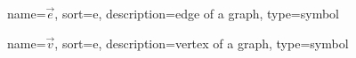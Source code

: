 	{%
		name=\ensuremath{\vec{e}},
		sort=e,
		description=edge of a graph,
		type=symbol
	}
	\newcommand{\edge}{\gls{sym:edge}}

	{%
		name=\ensuremath{\vec{v}},
		sort=e,
		description=vertex of a graph,
		type=symbol
	}
	\newcommand{\vertex}{\gls{sym:vertex}}
